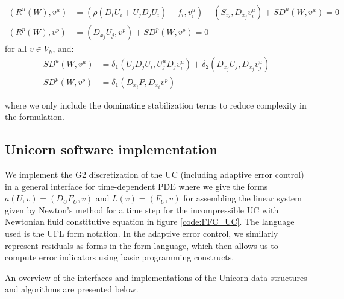 \begin{align}
  (R^u(W), v^u) &= (\rho(D_t U_i + U_j D_j U_i) - f_i, v^u_i) + (S_{ij}, D_{x_j} v^u_i) + SD^u(W, v^u) = 0\\
  (R^p(W), v^p) &= (D_{x_j} U_j, v^p) + SD^p(W, v^p) = 0
\end{align}
for all $v \in V_h$, and:
\begin{align}
  SD^u(W, v^u) &= \delta_1 (U_j D_j U_i, U^u_j D_j v^u_i) +
  \delta_2 (D_{x_j} U_j, D_{x_j} v^u_j)\\
  SD^p(W, v^p) &= \delta_1 (D_{x_i} P, D_{x_i} v^p)
\end{align}

where we only include the dominating stabilization terms to reduce
complexity in the formulation.

\subsection{Unicorn software implementation}

We implement the G2 discretization of the UC (including adaptive error
control) in a general interface for time-dependent PDE where we give
the forms $a(U, v) = (D_U F_U, v)$ and $L(v) = (F_U, v)$ for
assembling the linear system given by Newton's method for a time step
for the incompressible UC with Newtonian fluid constitutive equation
in figure \ref{code:FFC_UC}. The language used is the
UFL \cite{KirbyLogg2006} form notation. In the adaptive error control,
we similarly represent residuals as forms in the form language, which
then allows us to compute error indicators using basic programming
constructs.

An overview of the interfaces and implementations of the Unicorn data
structures and algorithms are presented below.

